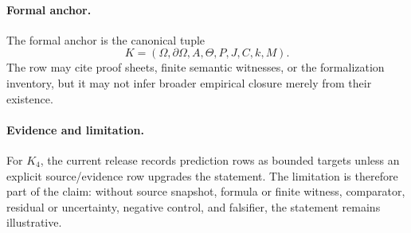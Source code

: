 \paragraph{Formal anchor.}
The formal anchor is the canonical tuple
\[
  K=(\Omega,\partial\Omega,A,\Theta,P,J,C,k,M).
\]
The row may cite proof sheets, finite semantic witnesses, or the formalization
inventory, but it may not infer broader empirical closure merely from their
existence.

\paragraph{Evidence and limitation.}
For \(K_4\), the current release records prediction rows as bounded
targets unless an explicit source/evidence row upgrades the statement. The
limitation is therefore part of the claim: without source snapshot, formula or
finite witness, comparator, residual or uncertainty, negative control, and
falsifier, the statement remains illustrative.

